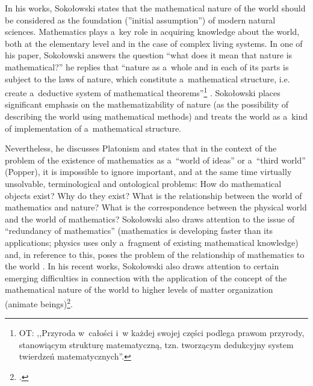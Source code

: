 \documentclass[%
  manuscript=article,
  year=2024,
  volume=77,
  doi=00000.000,
]{zfn}
\begin{document}
In his works, Sokołowski states that the mathematical nature of the world should be considered as the foundation (''initial assumption'') of modern natural sciences. Mathematics plays a~key role in acquiring knowledge about the world, both at the elementary level and in the case of complex living systems. In one of his paper, Sokołowski answers the question ``what does it mean that nature is mathematical?'' he replies that ``nature as a~whole and in each of its parts is subject to the laws of nature, which constitute a~mathematical structure, i.e. create a~deductive system of mathematical theorems''\footnote{OT: ,,Przyroda w~całości i~w każdej swojej części podlega prawom przyrody, stanowiącym strukturę matematyczną, tzn. tworzącym dedukcyjny system twierdzeń matematycznych''.} 
\parencite[][]{}. %
 Sokołowski places significant emphasis on the mathematizability of nature (as the possibility of describing the world using mathematical methods) and treats the world as a~kind of implementation of a~mathematical structure.



Nevertheless, he discusses Platonism and states that in the context of the problem of the existence of mathematics as a~``world of ideas'' or a~``third world'' (Popper), it is impossible to ignore important, and at the same time virtually unsolvable, terminological and ontological problems: How do mathematical objects exist? Why do they exist? What is the relationship between the world of mathematics and nature? What is the correspondence between the physical world and the world of mathematics? Sokołowski also draws attention to the issue of ``redundancy of mathematics'' (mathematics is developing faster than its applications; physics uses only a~fragment of existing mathematical knowledge) and, in reference to this, poses the problem of the relationship of mathematics to the world 
\parencite[][pp.217–220]{}. %
 In his recent works, Sokołowski also draws attention to certain emerging difficulties in connection with the application of the concept of the mathematical nature of the world to higher levels of matter organization (animate beings)\footnote{
\parencite[][p.74]{}.%
}.
\end{document}
